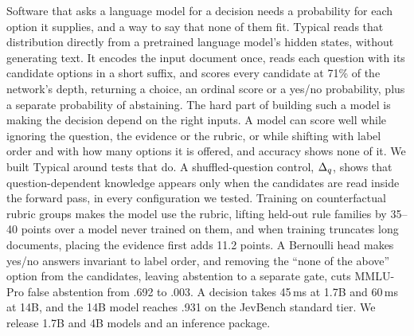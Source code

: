 Software that asks a language model for a decision needs a probability for each option it supplies,
and a way to say that none of them fit. Typical reads that distribution directly from a pretrained
language model's hidden states, without generating text. It encodes the input document once, reads each
question with its candidate options in a short suffix, and scores every candidate at 71\% of the
network's depth, returning a choice, an ordinal score or a yes/no probability, plus a separate
probability of abstaining. The hard part of building such a model is making the decision depend on the
right inputs. A model can score well while ignoring the question, the evidence or the rubric, or while
shifting with label order and with how many options it is offered, and accuracy shows none of it. We
built Typical around tests that do. A shuffled-question control, $\Delta_q$, shows that question-dependent
knowledge appears only when the candidates are read inside the forward pass, in every configuration we
tested. Training on counterfactual rubric groups makes the model use the rubric, lifting held-out rule families
by 35--40 points over a model never trained on them, and when training truncates long documents,
placing the evidence first adds 11.2 points. A Bernoulli head
makes yes/no answers invariant to label order, and removing the ``none of the above'' option from the candidates, leaving abstention to a separate gate,
cuts MMLU-Pro false abstention from .692 to .003. A decision takes 45\,ms at
1.7B and 60\,ms at 14B, and the 14B model reaches .931 on the JevBench standard tier. We release 1.7B
and 4B models and an inference package.
